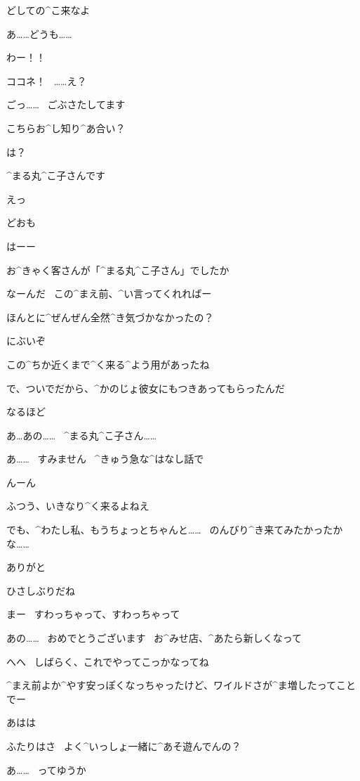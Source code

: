 \Maruko どしての^{こ}{来}なよ

\page[16]
\Kokone あ……どうも……

\Alpha わー！！

\Alpha ココネ！
\ ……え？

\Kokone ごっ……
\ ごぶさたしてます

\Alpha こちらお^{し}{知}り^{あ}{合}い？

\Kokone は？

\Kokone ^{まる}{丸}^{こ}{子}さんです

\Alpha えっ

\page[17]
\Maruko どおも

\Alpha はーー

\Alpha お^{きゃく}{客}さんが「^{まる}{丸}^{こ}{子}さん」でしたか

\Alpha なーんだ
\ この^{まえ}{前}、^{い}{言}ってくれればー

\Maruko ほんとに^{ぜんぜん}{全然}^{き}{気}づかなかったの？

\Maruko にぶいぞ

\page[18]
\Maruko この^{ちか}{近}くまで^{く}{来}る^{よう}{用}があったね

\Maruko で、ついでだから、^{かのじょ}{彼女}にもつきあってもらったんだ

\Alpha なるほど

\Kokone あ…あの……
\ ^{まる}{丸}^{こ}{子}さん……

\Kokone あ……
\ すみません
\ ^{きゅう}{急}な^{はなし}{話}で

\Alpha んーん

\page[19]
\Maruko ふつう、いきなり^{く}{来}るよねえ

\Kokone でも、^{わたし}{私}、もうちょっとちゃんと……
\ のんびり^{き}{来}てみたかったかな……

\Alpha ありがと

\Alpha ひさしぶりだね

\Alpha まー
\ すわっちゃって、すわっちゃって

\page[20]
\Kokone あの……
\ おめでとうございます
\ お^{みせ}{店}、^{あたら}{新}しくなって

\Alpha へへ
\ しばらく、これでやってこっかなってね

\Alpha ^{まえ}{前}よか^{やす}{安}っぽくなっちゃったけど、ワイルドさが^{ま}{増}したってことでー

\Kokone あはは

\page[21]
\Alpha ふたりはさ
\ よく^{いっしょ}{一緒}に^{あそ}{遊}んでんの？

\Kokone あ……
\ ってゆうか

